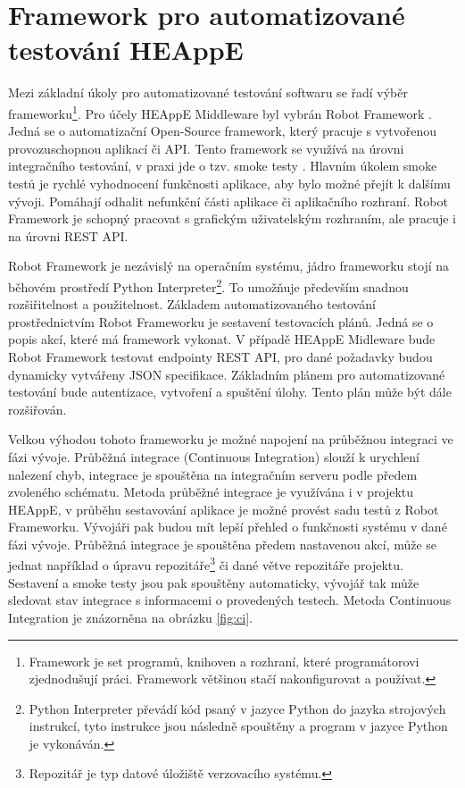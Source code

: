 \section{Framework pro automatizované testování HEAppE}
Mezi základní úkoly pro automatizované testování softwaru se řadí výběr frameworku\footnote{Framework je set programů, knihoven a rozhraní, které programátorovi zjednodušují práci. Framework většinou stačí nakonfigurovat a používat.}. Pro účely HEAppE Middleware byl vybrán Robot Framework \cite{UDdvJfGpGdOGQs2a}. Jedná se o automatizační Open-Source framework, který pracuje s vytvořenou provozuschopnou aplikací či API. Tento framework se využívá na úrovni integračního testování, v praxi jde o tzv. smoke testy \cite{K35ZsSqAfq3Ec1XJ}. Hlavním úkolem smoke testů je rychlé vyhodnocení funkčnosti aplikace, aby bylo možné přejít k dalšímu vývoji. Pomáhají odhalit nefunkční části aplikace či aplikačního rozhraní. Robot Framework je schopný pracovat s grafickým uživatelským rozhraním, ale pracuje i na úrovni REST API.

Robot Framework je nezávislý na operačním systému, jádro frameworku stojí na běhovém prostředí Python Interpreter\footnote{Python Interpreter převádí kód psaný v jazyce Python do jazyka strojových instrukcí, tyto instrukce jsou následně spouštěny a program v jazyce Python je vykonáván.}. To umožňuje především snadnou rozšiřitelnost a použitelnost. Základem automatizovaného testování prostřednictvím Robot Frameworku je sestavení testovacích plánů. Jedná se o popis akcí, které má framework vykonat. V případě HEAppE Midleware bude Robot Framework testovat endpointy REST API, pro dané požadavky budou dynamicky vytvářeny JSON specifikace. Základním plánem pro automatizované testování bude autentizace, vytvoření a spuštění úlohy. Tento plán může být dále rozšiřován.

Velkou výhodou tohoto frameworku je možné napojení na průběžnou integraci ve fázi vývoje. Průběžná integrace (Continuous Integration) slouží k urychlení nalezení chyb, integrace je spouštěna na integračním serveru podle předem zvoleného schématu. Metoda průběžné integrace je využívána i v projektu HEAppE, v průběhu sestavování aplikace je možné provést sadu testů z Robot Frameworku. Vývojáři pak budou mít lepší přehled o funkčnosti systému v dané fázi vývoje. Průběžná integrace je spouštěna předem nastavenou akcí, může se jednat například o úpravu repozitáře\footnote{Repozitář je typ datové úložiště verzovacího systému.} či dané větve repozitáře projektu. Sestavení a smoke testy jsou pak spouštěny automaticky, vývojář tak může sledovat stav integrace s informacemi o provedených testech. Metoda Continuous Integration je znázorněna na obrázku \ref{fig:ci}.

